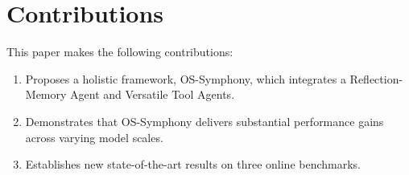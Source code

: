 \documentclass{article}
\begin{document}
\section{Contributions}
This paper makes the following contributions:

\begin{enumerate}
\item Proposes a holistic framework, OS-Symphony, which integrates a Reflection-Memory Agent and Versatile Tool Agents.
\item Demonstrates that OS-Symphony delivers substantial performance gains across varying model scales.
\item Establishes new state-of-the-art results on three online benchmarks.
\end{enumerate}
\end{document}
